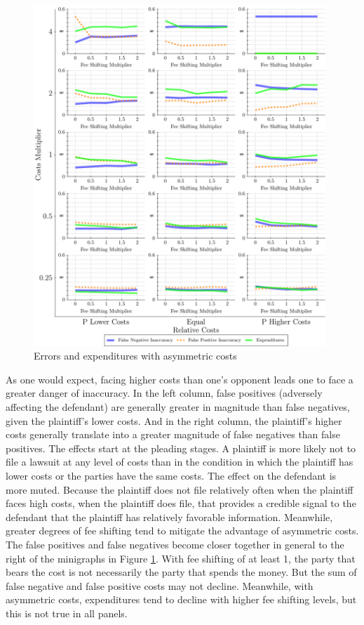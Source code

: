 \documentclass{article}
\begin{document}
\begin{figure}
\begin{minipage}{0.48\textwidth}
        \includegraphics[width=0.98\textwidth, scale=0.70, trim={0in 0in 0in 0in}, clip]{../Figures/Accuracy and Expenditures Varying Relative Costs} %
        \caption{Errors and expenditures with asymmetric costs}
		\label{fig:accexp_costsasymmetry}
    \end{minipage}
\end{figure}

As one would expect, facing higher costs than one's opponent leads one to face a greater danger of inaccuracy. In the left column, false positives (adversely affecting the defendant) are generally greater in magnitude than false negatives, given the plaintiff's lower costs. And in the right column, the plaintiff's higher costs generally translate into a greater magnitude of false negatives than false positives. The effects start at the pleading stages. A plaintiff is more likely not to file a lawsuit at any level of costs than in the condition in which the plaintiff has lower costs or the parties have the same costs. The effect on the defendant is more muted. Because the plaintiff does not file relatively often when the plaintiff faces high costs, when the plaintiff does file, that provides a credible signal to the defendant that the plaintiff has relatively favorable information. Meanwhile, greater degrees of fee shifting tend to mitigate the advantage of asymmetric costs. The false positives and false negatives become closer together in general to the right of the minigraphs in Figure \ref{fig:accexp_costsasymmetry}. With fee shifting of at least 1, the party that bears the cost is not necessarily the party that spends the money. But the sum of false negative and false positive costs may not decline.  Meanwhile, with asymmetric costs, expenditures tend to decline with higher fee shifting levels, but this is not true in all panels.
\end{document}
